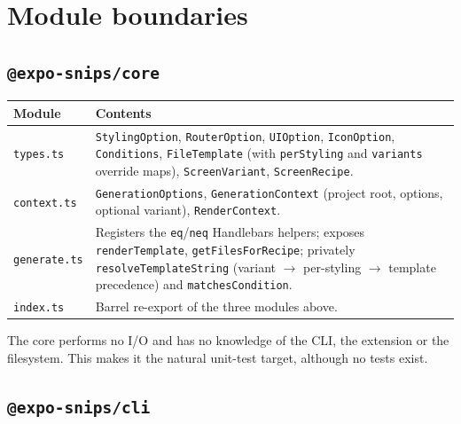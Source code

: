 \section{Module boundaries}

\subsection*{\texttt{@expo-snips/core}}

\begin{longtable}{@{}L{2.8cm}L{11.2cm}@{}}
\toprule
\textbf{Module} & \textbf{Contents} \\
\midrule
\endhead
\texttt{types.ts} & \texttt{StylingOption}, \texttt{RouterOption}, \texttt{UIOption},
\texttt{IconOption}, \texttt{Conditions}, \texttt{FileTemplate} (with
\texttt{perStyling} and \texttt{variants} override maps), \texttt{ScreenVariant},
\texttt{ScreenRecipe}. \\
\texttt{context.ts} & \texttt{GenerationOptions}, \texttt{GenerationContext}
(project root, options, optional variant), \texttt{RenderContext}. \\
\texttt{generate.ts} & Registers the \texttt{eq}/\texttt{neq} Handlebars helpers;
exposes \texttt{renderTemplate}, \texttt{getFilesForRecipe}; privately
\texttt{resolveTemplateString} (variant $\rightarrow$ per-styling $\rightarrow$
template precedence) and \texttt{matchesCondition}. \\
\texttt{index.ts} & Barrel re-export of the three modules above. \\
\bottomrule
\end{longtable}

The core performs no I/O and has no knowledge of the CLI, the extension or the
filesystem. This makes it the natural unit-test target, although no tests exist.

\subsection*{\texttt{@expo-snips/cli}}

